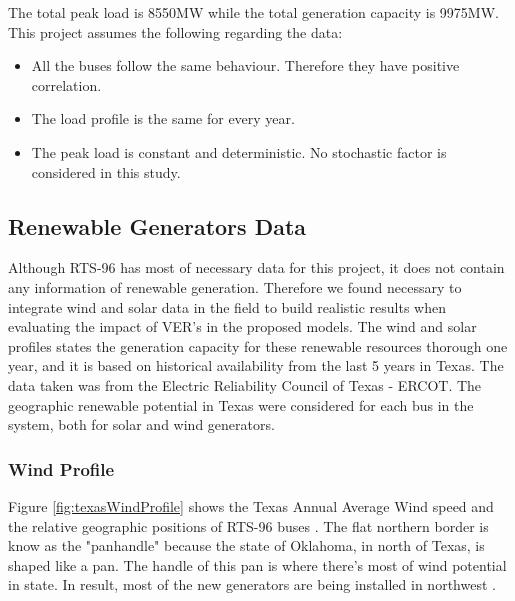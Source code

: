 \documentclass[12pt,LUDisStyle,twosided]{book}
\begin{document}
The total peak load is 8550MW while the total generation capacity is 9975MW. This project assumes the following regarding the data:

\begin{itemize}
\item All the buses follow the same behaviour. Therefore they have positive correlation.
\item The load profile is the same for every year.
\item The peak load is constant and deterministic. No stochastic factor is considered in this study.
\end{itemize}


\subsection{Renewable Generators Data}

Although RTS-96 has most of necessary data for this project, it does not contain any information of renewable generation. Therefore we found necessary to integrate wind and solar data in the field to build realistic results when evaluating the impact of VER's in the proposed models. The wind and solar profiles states the generation capacity for these renewable resources thorough one year, and it is based on historical availability from the last 5 years in Texas.  The data taken was from the Electric Reliability Council of Texas - ERCOT. The geographic renewable potential in Texas were considered for each bus in the system, both for solar and wind generators.

\subsubsection{Wind Profile}


Figure \ref{fig:texasWindProfile} shows the Texas Annual Average Wind speed and the relative geographic positions of RTS-96 buses \cite{wongieee}. The flat northern border is know as the "panhandle" because the state of Oklahoma, in north of Texas, is shaped like a pan. The handle of this pan is where there's most of wind potential in state. In result, most of the new generators are being installed in northwest \cite{texasWindProfile}.
\end{document}
